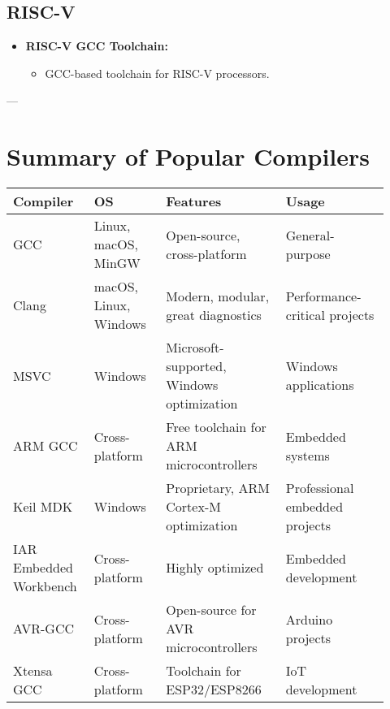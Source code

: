 \documentclass[a4paper,12pt]{article}
\begin{document}
\subsection{RISC-V}
\begin{itemize}
	\item \textbf{RISC-V GCC Toolchain:}
	\begin{itemize}
		\item GCC-based toolchain for RISC-V processors.
	\end{itemize}
\end{itemize}

---

\section{Summary of Popular Compilers}

\begin{tabular}{|p{0.18\linewidth}|p{0.18\linewidth}|p{0.30\linewidth}|p{0.26\linewidth}|}
	\hline
	\textbf{Compiler} & \textbf{OS} & \textbf{Features} & \textbf{Usage} \\ \hline
	GCC & Linux, macOS, MinGW & Open-source, cross-platform & General-purpose \\ \hline
	Clang & macOS, Linux, Windows & Modern, modular, great diagnostics & Performance-critical projects \\ \hline
	MSVC & Windows & Microsoft-supported, Windows optimization & Windows applications \\ \hline
	ARM GCC & Cross-platform & Free toolchain for ARM microcontrollers & Embedded systems \\ \hline
	Keil MDK & Windows & Proprietary, ARM Cortex-M optimization & Professional embedded projects \\ \hline
	IAR Embedded Workbench & Cross-platform & Highly optimized & Embedded development \\ \hline
	AVR-GCC & Cross-platform & Open-source for AVR microcontrollers & Arduino projects \\ \hline
	Xtensa GCC & Cross-platform & Toolchain for ESP32/ESP8266 & IoT development \\ \hline
\end{tabular}
\end{document}
